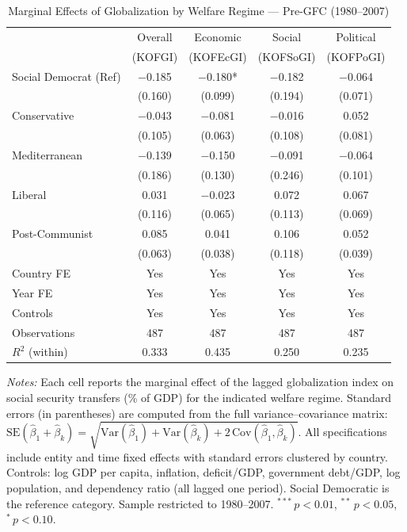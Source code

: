 \begin{table}[htbp]
\centering
\caption{Marginal Effects of Globalization by Welfare Regime — Pre-GFC (1980–2007)}
\label{tab:marginal_effects_pre_gfc}
\begin{tabular}{lcccc}
\toprule
 & Overall & Economic & Social & Political \\
 & (KOFGI) & (KOFEcGI) & (KOFSoGI) & (KOFPoGI) \\
\midrule
Social Democrat (Ref) & $-$0.185 & $-$0.180* & $-$0.182 & $-$0.064 \\
 & (0.160) & (0.099) & (0.194) & (0.071) \\
\addlinespace
Conservative & $-$0.043 & $-$0.081 & $-$0.016 & \phantom{$-$}0.052 \\
 & (0.105) & (0.063) & (0.108) & (0.081) \\
\addlinespace
Mediterranean & $-$0.139 & $-$0.150 & $-$0.091 & $-$0.064 \\
 & (0.186) & (0.130) & (0.246) & (0.101) \\
\addlinespace
Liberal & \phantom{$-$}0.031 & $-$0.023 & \phantom{$-$}0.072 & \phantom{$-$}0.067 \\
 & (0.116) & (0.065) & (0.113) & (0.069) \\
\addlinespace
Post-Communist & \phantom{$-$}0.085 & \phantom{$-$}0.041 & \phantom{$-$}0.106 & \phantom{$-$}0.052 \\
 & (0.063) & (0.038) & (0.118) & (0.039) \\
\midrule
Country FE & Yes & Yes & Yes & Yes \\
Year FE & Yes & Yes & Yes & Yes \\
Controls & Yes & Yes & Yes & Yes \\
Observations & 487 & 487 & 487 & 487 \\
$R^2$ (within) & 0.333 & 0.435 & 0.250 & 0.235 \\
\bottomrule
\end{tabular}
\begin{tablenotes}
\small
\item \textit{Notes:} Each cell reports the marginal effect of the lagged globalization index on social security transfers (\% of GDP) for the indicated welfare regime. Standard errors (in parentheses) are computed from the full variance--covariance matrix: $\mathrm{SE}(\hat\beta_1 + \hat\beta_k) = \sqrt{\mathrm{Var}(\hat\beta_1) + \mathrm{Var}(\hat\beta_k) + 2\,\mathrm{Cov}(\hat\beta_1, \hat\beta_k)}$. All specifications include entity and time fixed effects with standard errors clustered by country. Controls: log GDP per capita, inflation, deficit/GDP, government debt/GDP, log population, and dependency ratio (all lagged one period). Social Democratic is the reference category. Sample restricted to 1980--2007. $^{***}\,p<0.01$, $^{**}\,p<0.05$, $^{*}\,p<0.10$.
\end{tablenotes}
\end{table}